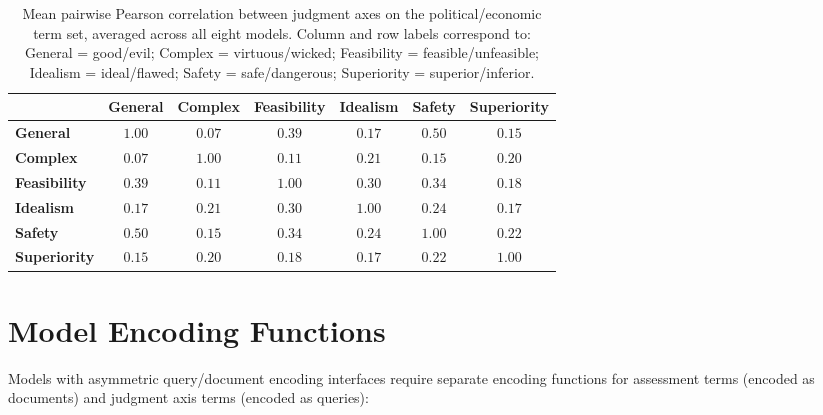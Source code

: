\documentclass[11pt, letterpaper]{article}
\begin{document}
\begin{table}[H]
  \centering
  \footnotesize
  \begin{tabular}{lcccccc}
    \toprule
    & \textbf{General} & \textbf{Complex} & \textbf{Feasibility} & \textbf{Idealism} & \textbf{Safety} & \textbf{Superiority} \\
    \midrule
    \textbf{General}     & $1.00$ & $0.07$ & $0.39$ & $0.17$ & $0.50$ & $0.15$ \\
    \textbf{Complex}     & $0.07$ & $1.00$ & $0.11$ & $0.21$ & $0.15$ & $0.20$ \\
    \textbf{Feasibility} & $0.39$ & $0.11$ & $1.00$ & $0.30$ & $0.34$ & $0.18$ \\
    \textbf{Idealism}    & $0.17$ & $0.21$ & $0.30$ & $1.00$ & $0.24$ & $0.17$ \\
    \textbf{Safety}      & $0.50$ & $0.15$ & $0.34$ & $0.24$ & $1.00$ & $0.22$ \\
    \textbf{Superiority} & $0.15$ & $0.20$ & $0.18$ & $0.17$ & $0.22$ & $1.00$ \\
    \bottomrule
  \end{tabular}
  \caption{Mean pairwise Pearson correlation between judgment axes on the political/economic term set, averaged across all eight models. Column and row labels correspond to: General = good/evil; Complex = virtuous/wicked; Feasibility = feasible/unfeasible; Idealism = ideal/flawed; Safety = safe/dangerous; Superiority = superior/inferior.}
  \label{tab:axis_correlation}
\end{table}

\section{Model Encoding Functions}

Models with asymmetric query/document encoding interfaces require separate encoding functions for assessment terms (encoded as documents) and judgment axis terms (encoded as queries):
\end{document}
